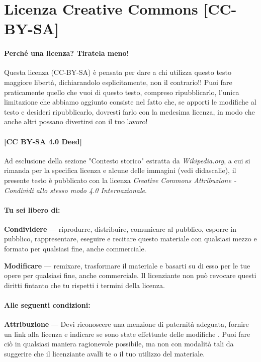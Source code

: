 \documentclass[letterpaper,twocolumn,openany,nodeprecatedcode]{dndbook}
\begin{document}
\chapter*{Licenza Creative Commons [CC-BY-SA]}
\subsubsection{Perché una licenza? Tiratela meno!}

Questa licenza (CC-BY-SA) è pensata per dare a chi utilizza questo testo maggiore libertà, dichiarandolo esplicitamente, non il contrario!! Puoi fare praticamente quello che vuoi di questo testo, compreso ripubblicarlo, l'unica limitazione che abbiamo aggiunto consiste nel fatto che, se apporti le modifiche al testo e desideri ripubblicarlo, dovresti farlo con la medesima licenza, in modo che anche altri possano divertirsi con il tuo lavoro!

\subsubsection{[CC BY-SA 4.0 Deed]}
Ad esclusione della sezione "Contesto storico" estratta da \textit{Wikipedia.org}, a cui si rimanda per la specifica licenza e alcune delle immagini (vedi didascalie), il presente testo è pubblicato con la licenza \textit{Creative Commons Attribuzione - Condividi allo stesso modo 4.0 Internazionale}.

\subsubsection{Tu sei libero di:}

    \textbf{Condividere} — riprodurre, distribuire, comunicare al pubblico, esporre in pubblico, rappresentare, eseguire e recitare questo materiale con qualsiasi mezzo e formato per qualsiasi fine, anche commerciale.
    
    \textbf{Modificare} — remixare, trasformare il materiale e basarti su di esso per le tue opere per qualsiasi fine, anche commerciale.
    Il licenziante non può revocare questi diritti fintanto che tu rispetti i termini della licenza.

\subsubsection{Alle seguenti condizioni:}

    \textbf{Attribuzione} — Devi riconoscere una menzione di paternità adeguata, fornire un link alla licenza e indicare se sono state effettuate delle modifiche . Puoi fare ciò in qualsiasi maniera ragionevole possibile, ma non con modalità tali da suggerire che il licenziante avalli te o il tuo utilizzo del materiale.
    
\end{document}
